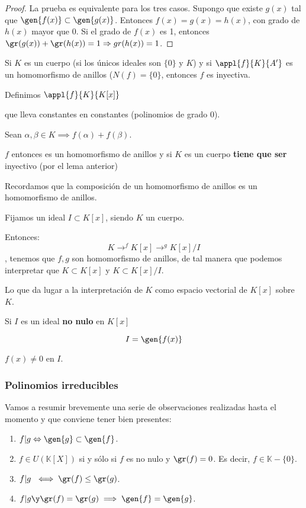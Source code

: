 \documentclass[nochap]{apuntes}
\begin{document}
\begin{proof}
La prueba es equivalente para los tres casos. Supongo que existe $g(x)$ tal que $\gen{f(x)} \subset  \gen{g(x)}$. Entonces $f(x)=g(x)=h(x)$, con grado de $h(x)$ mayor que 0.
  Si el grado de $f(x)$ es 1, entonces $\gr(g(x))+\gr(h(x))=1 \Rightarrow  gr(h(x))=1$.
\end{proof}

\begin{lemma}
Si $K$ es un cuerpo (si los únicos ideales son $\{0\}$ y $K$) y si $\appl{f}{K}{A'}$ es un homomorfismo de anillos ($N(f) = \{0\}$, entonces $f$ es inyectiva.
\end{lemma}

\begin{example}
Definimos $\appl{f}{K}{K[x]}$

que lleva constantes en constantes (polinomios de grado 0).

Sean $\alpha,\beta \in K \implies f(\alpha) + f(\beta)$.

$f$ entonces es un homomorfismo de anillos y si $K$ es un cuerpo \textbf{tiene que ser} inyectivo (por el lema anterior)
\end{example}

Recordamos que la composición de un homomorfismo de anillos es un homomorfismo de anillos.

\begin{example}

Fijamos un ideal $I\subset K[x]$, siendo $K$ un cuerpo.

Entonces:
\[K \to^f K[x] \to^g K[x]/I\], tenemos que $f,g$ son homomorfismo de anillos, de tal manera que podemos interpretar que $K\subset K[x]$ y $K\subset K[x]/I$.

Lo que da lugar a la interpretación de $K$ como espacio vectorial de $K[x]$ sobre $K$.
\end{example}

Si $I$ es un ideal \textbf{no nulo} en $K[x]$

\[I = \gen{f(x)}\]

$f(x) \neq 0$ en $I$.

\subsubsection{Polinomios irreducibles}
Vamos a resumir brevemente una serie de observaciones realizadas hasta el momento y que conviene tener bien presentes:
\begin{enumerate}
 \item $f|g \Leftrightarrow  \gen{g} \subset \gen{f}$.
 \item $f\in  U(\mathbb{K}[X])$ si y sólo si $f$ es no nulo y $\gr(f)=0$. Es decir, $f \in \mathbb{K}-\{0\}$.
 \item $f|g \iff \gr(f) \leq \gr(g)$.
 \item $f|g \y  \gr(f)=\gr(g) \implies  \gen{f}=\gen{g}$.
\end{enumerate}
\end{document}
